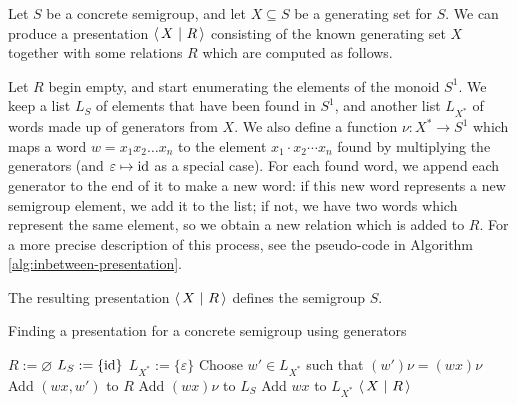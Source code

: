 \begin{method}
  \label{meth:inbetween-presentation}
  Let $S$ be a concrete semigroup, and let $X \subseteq S$ be a generating set
  for $S$.  We can produce a presentation $\left\langle\,X ~\middle|~ R\,\right\rangle$ consisting of the known
  generating set $X$ together with some relations $R$ which are computed as
  follows.

  Let $R$ begin empty, and start enumerating the elements of the monoid $S^1$.
  We keep a list $L_S$ of elements that have been found in $S^1$, and another
  list $L_{X^*}$ of words made up of generators from $X$.  We also define a
  function $\nu : X^* \to S^1$ which maps a word $w=x_1x_2\ldots x_n$ to the
  element $x_1\cdot x_2\cdots x_n$ found by multiplying the generators (and
  $\varepsilon \mapsto \operatorname{id}$ as a special case).  For each found word, we append
  each generator to the end of it to make a new word: if this new word
  represents a new semigroup element, we add it to the list; if not, we have two
  words which represent the same element, so we obtain a new relation which is
  added to $R$.  For a more precise description of this process, see the
  pseudo-code in Algorithm \ref{alg:inbetween-presentation}.

  The resulting presentation $\left\langle\,X ~\middle|~ R\,\right\rangle$ defines the semigroup $S$.
\end{method}

\begin{algorithm}
\caption{Finding a presentation for a concrete semigroup using generators}
\label{alg:inbetween-presentation}
  \begin{algorithmic}
      \State $R := \varnothing$
      \State $L_S := \{\operatorname{id}\}$
      \State $L_{X^*} := \{\varepsilon\}$
          \State Choose $w' \in L_{X^*}$ such that $(w')\nu = (wx)\nu$
            \State Add $(wx, w')$ to $R$
          \Else
            \State Add $(wx)\nu$ to $L_S$
            \State Add $wx$ to $L_{X^*}$
          \EndIf
        \EndFor
      \EndFor
      \State \Return $\left\langle\,X ~\middle|~ R\,\right\rangle$
    \EndProcedure
  \end{algorithmic}
\end{algorithm}


